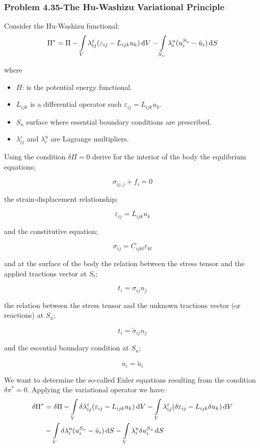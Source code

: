 \subsubsection*{Problem 4.35-The Hu-Washizu Variational Principle}
Consider the Hu-Washizu functional:
\begin{equation}
\Pi^* = \Pi  - \int\limits_V \lambda_{ij}^\varepsilon (\varepsilon_{ij} - L_{ijk} u_k)\dd{V}  - \int\limits_{S_u} \lambda_i^u(u_i^{S_u} - \bar{ u}_i)\dd{S}
\label{eq:Hu}
\end{equation}

where
\begin{itemize}
\item $\Pi$: is the potential energy functional.
\item $L_{ijk}$ is a differential operator such $\varepsilon_{ij} = L_{ijk} u_k$.
\item $S_u$ surface where essential boundary conditions are prescribed.
\item $\lambda_{ij}^\varepsilon $ and $\lambda_i^u$ are Lagrange multipliers.
\end{itemize}

Using the condition $\delta \Pi = 0$ derive for the interior of the body the equlibrium equations;

\[{\sigma _{ij,j}} + {f_i} = 0\]

the strain-displacement relationship;

\[{\varepsilon _{ij}} = {L_{ijk}}{u_k}\]

and the constitutive equation;

\[{\sigma _{ij}} = {C_{ijkl}}{\varepsilon _{kl}}\]

and at the surface of the body the relation between the stress tensor and the applied tractions vector at $S_t$;

\[{t_i} = {\sigma _{ij}}{n_j}\]

the relation between the stress tensor and the unknown tractions vector (or reactions) at $S_u$; 

\[{t_i} = {{\tilde \sigma }_{ij}}{n_j}\]

and the escential boundary condition at $S_u$;

\[{u_i} = {{\tilde u}_i}\]

We want to determine the so-called Euler equations resulting from the condition $\delta \pi^* = 0$. Applying the variational operator we have:
\begin{equation}
\begin{aligned}
\delta \Pi^*& = \delta \Pi  - \int\limits_V \delta \lambda_{ij}^{\varepsilon}  (\varepsilon_{ij} - L_{ijk} u_k)\dd{V}- \int\limits_V \lambda_{ij}^\varepsilon (\delta \varepsilon_{ij} - L_{ijk}\delta u_k)\dd{V} \\
&-\int\limits_V \delta \lambda_i^u (u_i^{S_u} - \bar u_i)\dd{S} - \int\limits_V \lambda _i^u \delta u_i^{S_u} \dd{S}
\end{aligned}
\end{equation}

